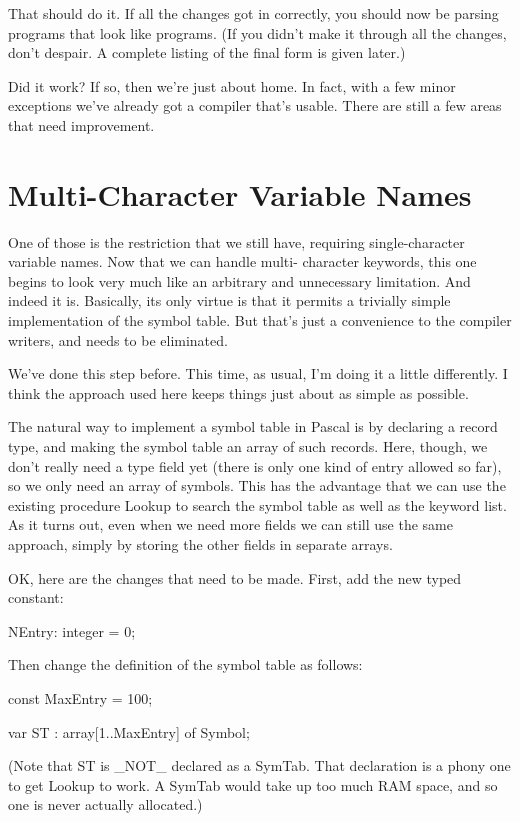 \documentclass[float=false, crop=false]{standalone}
\begin{document}
That should do it. If all the changes got in correctly, you should now be
parsing programs that look like programs. (If you didn't make it through all the
changes, don't despair. A complete listing of the final form is given later.)

Did it work? If so, then we're just about home. In fact, with a few minor
exceptions we've already got a compiler that's usable. There are still a few
areas that need improvement.

\section{Multi-Character Variable Names}

One of those is the restriction that we still have, requiring single-character
variable names. Now that we can handle multi- character keywords, this one
begins to look very much like an arbitrary and unnecessary limitation. And
indeed it is. Basically, its only virtue is that it permits a trivially simple
implementation of the symbol table. But that's just a convenience to the
compiler writers, and needs to be eliminated.

We've done this step before. This time, as usual, I'm doing it a little
differently. I think the approach used here keeps things just about as simple as
possible.

The natural way to implement a symbol table in Pascal is by declaring a record
type, and making the symbol table an array of such records. Here, though, we
don't really need a type field yet (there is only one kind of entry allowed so
far), so we only need an array of symbols. This has the advantage that we can
use the existing procedure Lookup to search the symbol table as well as the
keyword list. As it turns out, even when we need more fields we can still use
the same approach, simply by storing the other fields in separate arrays.

OK, here are the changes that need to be made. First, add the new typed
constant:


      NEntry: integer = 0;


Then change the definition of the symbol table as follows:


const MaxEntry = 100;

var ST   : array[1..MaxEntry] of Symbol;


(Note that ST is _NOT_ declared as a SymTab. That declaration is a phony one to
get Lookup to work. A SymTab would take up too much RAM space, and so one is
never actually allocated.)
\end{document}
